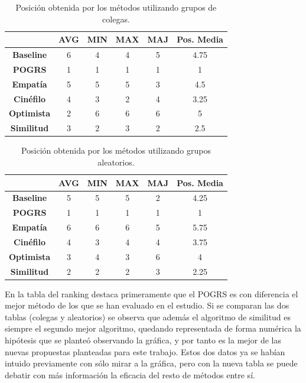 \begin{table}[H]
	\centering
	\begin{tabular}{ccccc|c}
		\toprule
		{} & \textbf{AVG} & \textbf{MIN} & \textbf{MAX} & \textbf{MAJ} & \textbf{Pos. Media} \\
		\midrule
		\textbf{Baseline} & 6 & 4 & 4 & 5 & 4.75 \\
		\midrule
		\textbf{POGRS} & 1 & 1 & 1 & 1 & 1 \\
		\midrule
		\textbf{Empatía} & 5 & 5 & 5 & 3 & 4.5 \\
		\textbf{Cinéfilo} & 4 & 3 & 2 & 4 & 3.25 \\
		\textbf{Optimista} & 2 & 6 & 6 & 6 & 5 \\
		\textbf{Similitud} & 3 & 2 & 3 & 2 & 2.5 \\
		\bottomrule
	\end{tabular}
	\caption{Posición obtenida por los métodos utilizando grupos de colegas.}
	\label{t:posicion-colegas}
\end{table}

\begin{table}[H]
	\centering
		\begin{tabular}{ccccc|c}
			\toprule
			{} & \textbf{AVG} & \textbf{MIN} & \textbf{MAX} & \textbf{MAJ} & \textbf{Pos. Media} \\
			\midrule
			\textbf{Baseline} & 5 & 5 & 5 & 2 & 4.25 \\
			\midrule
			\textbf{POGRS} & 1 & 1 & 1 & 1 & 1 \\
			\midrule
			\textbf{Empatía} & 6 & 6 & 6 & 5 & 5.75 \\
			\textbf{Cinéfilo} & 4 & 3 & 4 & 4 & 3.75 \\
			\textbf{Optimista} & 3 & 4 & 3 & 6 & 4 \\
			\textbf{Similitud} & 2 & 2 & 2 & 3 & 2.25 \\
			\bottomrule
	\end{tabular}
	\caption{Posición obtenida por los métodos utilizando grupos aleatorios.}
	\label{t:posicion-aleatorios}
\end{table}

En la tabla del ranking destaca primeramente que el POGRS es con diferencia el mejor método de los que se han evaluado en el estudio. Si se comparan las dos tablas (colegas y aleatorios) se observa que además el algoritmo de similitud es siempre el segundo mejor algoritmo, quedando representada de forma numérica la hipótesis que se planteó observando la gráfica, y por tanto es la mejor de las nuevas propuestas planteadas para este trabajo. Estos dos datos ya se habían intuido previamente con sólo mirar a la gráfica, pero con la nueva tabla se puede debatir con más información la eficacia del resto de métodos entre sí.

